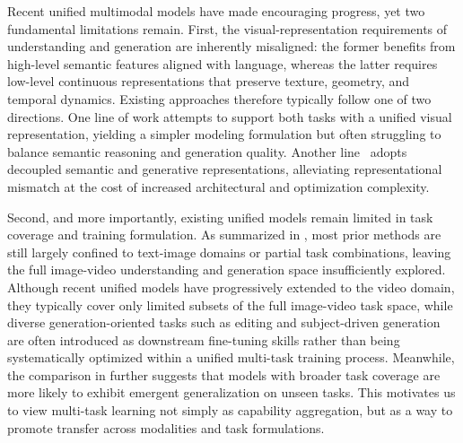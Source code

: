 Recent unified multimodal models \cite{team2024chameleon,cui2025emu3,deng2025emerging,xie2025show,liao2025mogao,liu2025tuna} have made encouraging progress, yet two fundamental limitations remain. First, the visual-representation requirements of understanding and generation are inherently misaligned: the former benefits from high-level semantic features aligned with language, whereas the latter requires low-level continuous representations that preserve texture, geometry, and temporal dynamics.
Existing approaches therefore typically follow one of two directions. One line of work \cite{xie2024show,team2024chameleon, wang2024emu3, cui2025emu3, liu2025tuna} attempts to support both tasks with a unified visual representation, yielding a simpler modeling formulation but often struggling to balance semantic reasoning and generation quality. Another line~\cite{deng2025emerging,liao2025mogao,xie2025show} adopts decoupled semantic and generative representations, alleviating representational mismatch at the cost of increased architectural and optimization complexity.


Second, and more importantly, existing unified models remain limited in task coverage and training formulation. As summarized in , most prior methods \cite{team2024chameleon,liu2024world,ge2024seed,qu2025tokenflow,wu2025janus} are still largely confined to text-image domains or partial task combinations, leaving the full image-video understanding and generation space insufficiently explored.
Although recent unified models \cite{deng2025emerging,xie2025show,liu2025tuna} have progressively extended to the video domain, they typically cover only limited subsets of the full image-video task space, while diverse generation-oriented tasks such as editing and subject-driven generation are often introduced as downstream fine-tuning skills rather than being systematically optimized within a unified multi-task training process.
Meanwhile, the comparison in  further suggests that models with broader task coverage are more likely to exhibit emergent generalization on unseen tasks. 
This motivates us to view multi-task learning not simply as capability aggregation, but as a way to promote transfer across modalities and task formulations.



